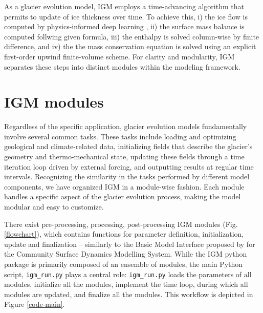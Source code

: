 \documentclass[10pt,twocolumn]{article}
\begin{document}
As a glacier evolution model, IGM employs a time-advancing algorithm that permits to update
of ice thickness over time. To achieve this, i) the ice flow is computed by
physics-informed deep learning \citep{jouvet2023ice}, ii) the surface mass balance is 
computed follwing given formula, iii) the enthalpy is solved column-wise
by finite difference, and iv) the the mass conservation equation is solved using 
an explicit first-order upwind finite-volume scheme. For clarity and modularity, IGM 
separates these steps into distinct modules within the modeling framework.

\section{IGM modules} 

Regardless of the specific application, glacier evolution models fundamentally involve 
several common tasks. These tasks include loading and optimizing geological and 
climate-related data, initializing fields that describe the glacier's geometry 
and thermo-mechanical state, updating these fields through a time iteration loop 
driven by external forcing, and outputting results at regular time intervals.
Recognizing the similarity in the tasks performed by different model components,
we have organized IGM in a module-wise fashion. Each module handles a specific 
aspect of the glacier evolution process, making the model modular and easy to customize.

There exist pre-processing, processing, post-processing IGM modules (Fig. \ref{flowchart}),
which contains functions for parameter definition, initialization, update and finalization
-- similarly to the Basic Model Interface proposed by \citet{Tucker2022} for the 
Community Surface Dynamics Modelling System.
While the IGM python package is primarily composed of an ensemble of modules, the main Python script,
\texttt{igm\_run.py} plays a central role: \texttt{igm\_run.py} loads the parameters of all modules, 
initialize all the modules, implement the time loop, during which all modules are updated,
and finalize all the modules. This workflow is depicted in Figure \ref{code-main}. 
\end{document}
